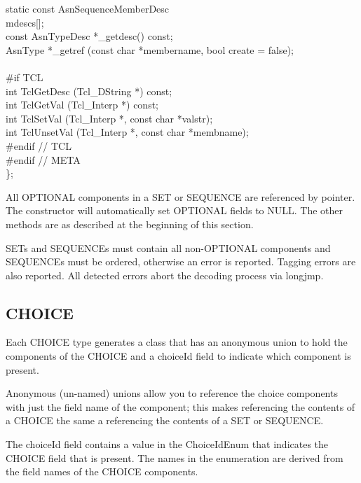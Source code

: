 \begin{Ccode}
  static const AsnSequenceMemberDesc   \\
				\>\>mdescs[];\\
  const AsnTypeDesc             \>\>*\_getdesc() const;\\
  AsnType                       \>\>*\_getref (const char *membername, bool create = false);\\
\\
\<\#if TCL\\
  int                   \>\>TclGetDesc (Tcl\_DString *) const;\\
  int                   \>\>TclGetVal (Tcl\_Interp *) const;\\
  int                   \>\>TclSetVal (Tcl\_Interp *, const char *valstr);\\
  int                   \>\>TclUnsetVal (Tcl\_Interp *, const char *membname);\\
\<\#endif // TCL\\
\<\#endif // META\\
\<\};
\end{Ccode}

All OPTIONAL components in a SET or SEQUENCE are referenced by pointer.
The constructor will automatically set OPTIONAL fields to {\C NULL}\@.  The
other methods are as described at the beginning of this section.

SETs and SEQUENCEs must contain all non-OPTIONAL components and
SEQUENCEs must be ordered, otherwise an error is reported.  Tagging
errors are also reported.  All detected errors abort the decoding
process via {\C longjmp}.

\subsection{\label{C++-choice-section}CHOICE}

Each CHOICE type generates a class that has an anonymous union to hold the
components of the CHOICE and a {\C choiceId} field to indicate which
component is present.

Anonymous (un-named) unions allow you to reference the choice components
with just the field name of the component; this makes referencing the
contents of a CHOICE the same a referencing the contents of a SET or
SEQUENCE\@.

The {\C choiceId} field contains a value in the {\C ChoiceIdEnum}
that indicates the CHOICE field that is present.  The names in the
enumeration are derived from the field names of the CHOICE components.

